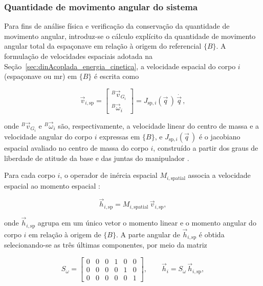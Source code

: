\subsubsection{Quantidade de movimento angular do sistema}
\label{sec:dinAcoplada_momento_angular}

Para fins de análise física e verificação da conservação da quantidade de movimento angular,
introduz-se o cálculo explícito da quantidade de movimento angular total da espaçonave em relação à origem do referencial $\{B\}$.
A formulação de velocidades espaciais adotada na Seção~\ref{sec:dinAcoplada_energia_cinetica}, a velocidade espacial do corpo $i$ (espaçonave ou \gls{mr}) em $\{B\}$ é escrita como

\begin{equation}
\vec v_{i,\text{sp}}
=
\begin{bmatrix}
{}^{B}\!\vec v_{G_i} \\[2pt]
{}^{B}\!\vec\omega_i
\end{bmatrix}
=
J_{\text{sp},i}(\vec q\,)\,\dot{\vec q\,},
\end{equation}

onde ${}^{B}\!\vec v_{G_i}$ e ${}^{B}\!\vec\omega_i$ são, respectivamente,
a velocidade linear do centro de massa e a velocidade angular do corpo $i$
expressas em $\{B\}$, e $J_{\text{sp},i}(\vec q\,)$ é o jacobiano espacial
avaliado no centro de massa do corpo $i$, construído a partir dos graus de
liberdade de atitude da base e das juntas do manipulador
\cite{featherstone2008}.

Para cada corpo $i$, o operador de inércia espacial
$M_{i,\text{spatial}}$ associa a velocidade espacial ao momento espacial
\cite{featherstone2008}:

\begin{equation}
\vec h_{i,\text{sp}}
=
M_{i,\text{spatial}}\,\vec v_{i,\text{sp}},
\end{equation}

onde $\vec h_{i,\text{sp}}$ agrupa em um único vetor o momento linear e o momento angular do corpo $i$ em relação à origem de $\{B\}$.
A parte angular de $\vec h_{i,\text{sp}}$ é obtida selecionando-se as
três últimas componentes, por meio da matriz

\begin{equation}
S_\omega
=
\begin{bmatrix}
0 & 0 & 0 & 1 & 0 & 0 \\
0 & 0 & 0 & 0 & 1 & 0 \\
0 & 0 & 0 & 0 & 0 & 1
\end{bmatrix},
\qquad
\vec h_i
=
S_\omega\,\vec h_{i,\text{sp}},
\end{equation}

